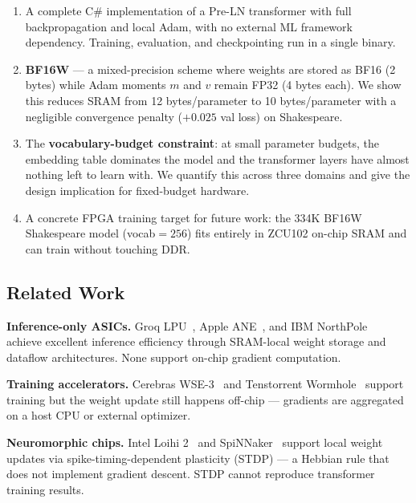 \documentclass[11pt]{article}
\begin{document}
\begin{enumerate}
  \item A complete C\# implementation of a Pre-LN transformer with full backpropagation
    and local Adam, with no external ML framework dependency.
    Training, evaluation, and checkpointing run in a single binary.

  \item \textbf{BF16W} --- a mixed-precision scheme where weights are stored as BF16
    (2 bytes) while Adam moments $m$ and $v$ remain FP32 (4 bytes each). We show this
    reduces SRAM from 12 bytes/parameter to 10 bytes/parameter with a negligible
    convergence penalty ($+0.025$ val loss) on Shakespeare.

  \item The \textbf{vocabulary-budget constraint}: at small parameter budgets, the
    embedding table dominates the model and the transformer layers have almost nothing
    left to learn with. We quantify this across three domains and give the design
    implication for fixed-budget hardware.

  \item A concrete FPGA training target for future work: the 334K BF16W Shakespeare model
    (vocab$=256$) fits entirely in ZCU102 on-chip SRAM and can train without touching DDR.
\end{enumerate}

\subsection{Related Work}

\textbf{Inference-only ASICs.}
Groq LPU~\cite{groq}, Apple ANE~\cite{apple_ane}, and IBM NorthPole~\cite{ibm_northpole}
achieve excellent inference efficiency through SRAM-local weight storage and dataflow
architectures. None support on-chip gradient computation.

\textbf{Training accelerators.}
Cerebras WSE-3~\cite{cerebras} and Tenstorrent Wormhole~\cite{tenstorrent} support
training but the weight update still happens off-chip --- gradients are aggregated
on a host CPU or external optimizer.

\textbf{Neuromorphic chips.}
Intel Loihi 2~\cite{loihi2} and SpiNNaker~\cite{spinnaker} support local weight updates
via spike-timing-dependent plasticity (STDP) --- a Hebbian rule that does not implement
gradient descent. STDP cannot reproduce transformer training results.

\end{document}
